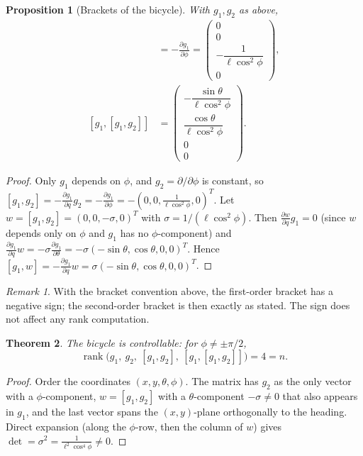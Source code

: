 \documentclass[11pt,a4paper]{article}
\newcommand{\LB}[2]{[#1,#2]}
\DeclareMathOperator{\rank}{rank}
\theoremstyle{plain}
\newtheorem{theorem}{Theorem}[section]
\newtheorem{proposition}[theorem]{Proposition}
\theoremstyle{definition}
\theoremstyle{remark}
\newtheorem*{remark}{Remark}
\begin{document}
\begin{proposition}[Brackets of the bicycle]
\label{prop:bicyclebr}
With $g_1,g_2$ as above,
\begin{align*}
\LB{g_1}{g_2}&=-\frac{\partial g_1}{\partial\phi}=\begin{pmatrix}0\\0\\-\dfrac{1}{\ell\cos^2\phi}\\0\end{pmatrix},\\
\LB{g_1}{\LB{g_1}{g_2}}&=\begin{pmatrix}-\dfrac{\sin\theta}{\ell\cos^2\phi}\\[6pt]\dfrac{\cos\theta}{\ell\cos^2\phi}\\0\\0\end{pmatrix}.
\end{align*}
\end{proposition}
\begin{proof}
Only $g_1$ depends on $\phi$, and $g_2=\partial/\partial\phi$ is constant, so $\LB{g_1}{g_2}=-\frac{\partial g_1}{\partial q}g_2=-\frac{\partial g_1}{\partial\phi}=-(0,0,\frac{1}{\ell\cos^2\phi},0)^T$. Let $w=\LB{g_1}{g_2}=(0,0,-\sigma,0)^T$ with $\sigma=1/(\ell\cos^2\phi)$. Then $\frac{\partial w}{\partial q}g_1=0$ (since $w$ depends only on $\phi$ and $g_1$ has no $\phi$-component) and $\frac{\partial g_1}{\partial q}w=-\sigma\frac{\partial g_1}{\partial\theta}=-\sigma(-\sin\theta,\cos\theta,0,0)^T$. Hence $\LB{g_1}{w}=-\frac{\partial g_1}{\partial q}w=\sigma(-\sin\theta,\cos\theta,0,0)^T$.
\end{proof}

\begin{remark}
With the bracket convention above, the first-order bracket has a negative sign; the second-order bracket is then exactly as stated. The sign does not affect any rank computation.
\end{remark}

\begin{theorem}
The bicycle is controllable: for $\phi\ne\pm\pi/2$,
\[
\rank\big(g_1,\ g_2,\ \LB{g_1}{g_2},\ \LB{g_1}{\LB{g_1}{g_2}}\big)=4=n .
\]
\end{theorem}
\begin{proof}
Order the coordinates $(x,y,\theta,\phi)$. The matrix has $g_2$ as the only vector with a $\phi$-component, $w=\LB{g_1}{g_2}$ with a $\theta$-component $-\sigma\neq0$ that also appears in $g_1$, and the last vector spans the $(x,y)$-plane orthogonally to the heading. Direct expansion (along the $\phi$-row, then the column of $w$) gives $\det=\sigma^2=\frac{1}{\ell^2\cos^4\phi}\ne0$.
\end{proof}
\end{document}
